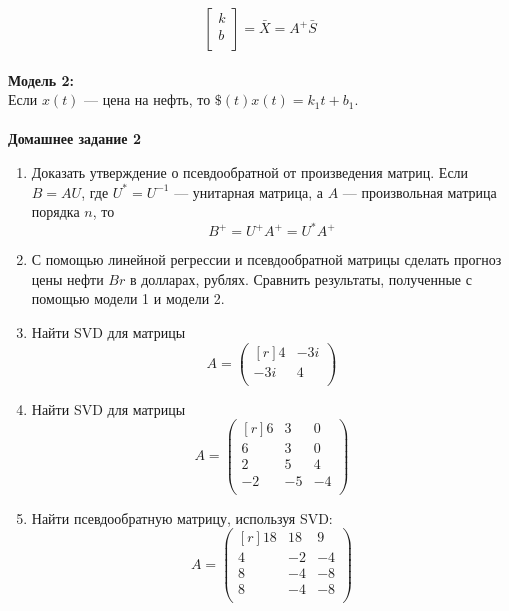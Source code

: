 \documentclass[12pt]{article}
\theoremstyle{definition}
\numberwithin{equation}{section}
\begin{document}
	\[\begin{bmatrix}
	k\\         
	b\\
	\end{bmatrix} = \bar X = A^+\bar S\]\\
	\textbf{Модель 2:}\\
	Если $x(t)$ --- цена на нефть, то $\$(t)x(t)=k_1t+b_1$.\\
	\\
	\textbf{Домашнее задание 2}
	\begin{enumerate}
		\item
		Доказать утверждение о псевдообратной от произведения матриц.
		Если $B=AU$, где $U^*=U^{-1}$ --- унитарная матрица, а $A$ --- произвольная матрица порядка $n$, то $$B^+=U^+A^+=U^*A^+$$ 
		\item
		С помощью линейной регрессии и псевдообратной матрицы сделать прогноз цены нефти $Br$ в долларах, рублях. Сравнить результаты, полученные с помощью модели 1 и модели 2.
		\item
		Найти SVD для матрицы\\
		\[A=\begin{pmatrix}[r]
		4 & -3i\\
		-3i & 4\\
		\end{pmatrix}\]
		\item
		Найти SVD для матрицы\\
		\[A=\begin{pmatrix}[r]
		6 & 3 & 0\\
		6 & 3 & 0\\
		2 & 5 & 4\\
		-2 & -5 & -4\\
		\end{pmatrix}\]
		\item
		Найти псевдообратную матрицу, используя SVD:\\
		\[A=\begin{pmatrix}[r]
		18 & 18 & 9\\
		4 & -2 & -4\\
		8 & -4 & -8\\
		8 & -4 & -8\\
		\end{pmatrix}\]
	\end{enumerate}
	~\\
\end{document}
